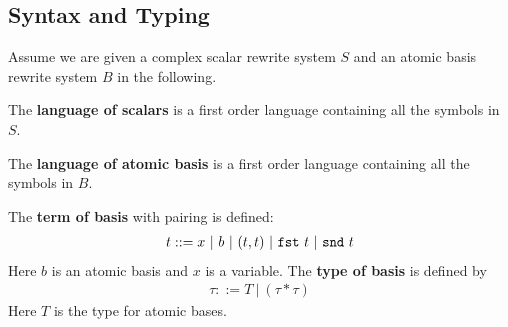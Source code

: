 \subsection{Syntax and Typing}

Assume we are given a complex scalar rewrite system $S$ and an atomic basis rewrite system $B$ in the following.

\begin{definition}
  The \textbf{language of scalars} is a first order language containing all the symbols in $S$.
\end{definition}


\begin{definition}
  The \textbf{language of atomic basis} is a first order language containing all the symbols in $B$.
\end{definition}


\begin{definition}
  The \textbf{term of basis} with pairing is defined:
  \begin{align*}
    t ::= x\ |\ b\ |\ (t, t)\ |\ \texttt{fst}\ t\ |\ \texttt{snd}\ t
  \end{align*}
  Here $b$ is an atomic basis and $x$ is a variable. The \textbf{type of basis} is defined by
  \begin{align*}
    \tau ::= T\ |\ (\tau * \tau)
  \end{align*}
  Here $T$ is the type for atomic bases.
\end{definition}

